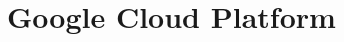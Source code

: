 \documentclass[a4paper, notitlepage]{report}
\begin{document}
\chapter{Google Cloud Platform}

%
%
%
%
%
%
%
%
%
%
%
%
%
%
%
%
\end{document}
